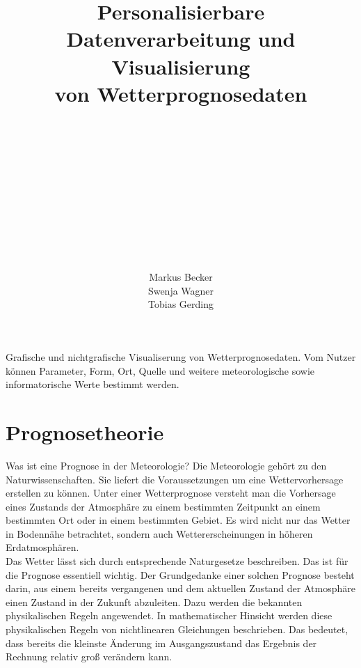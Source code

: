 \documentclass[a4paper,oneside,10pt,titlepage]{article}
\begin{document}
\linespread{.9}
\pagestyle{empty}
\title{Personalisierbare\\Datenverarbeitung und Visualisierung\\von Wetterprognosedaten}
\author{\\\\\\\\\\\\\\\\\\\\\\Markus Becker\\Swenja Wagner\\Tobias Gerding}

\maketitle
\pagestyle{empty}
\tableofcontents
\thispagestyle{empty}
\pagestyle{plain}
\newpage

Grafische und nichtgrafische Visualiserung von Wetterprognosedaten. Vom Nutzer können Parameter, Form, Ort, Quelle und weitere meteorologische sowie informatorische Werte bestimmt werden.
\section{Prognosetheorie}
Was ist eine Prognose in der Meteorologie?
Die Meteorologie gehört zu den Naturwissenschaften. Sie liefert die Voraussetzungen um eine Wettervorhersage erstellen zu können. Unter einer Wetterprognose versteht man die Vorhersage eines Zustands der Atmosphäre zu einem bestimmten Zeitpunkt an einem bestimmten Ort oder in einem bestimmten Gebiet. Es wird nicht nur das Wetter in Bodennähe betrachtet, sondern auch Wettererscheinungen in höheren Erdatmosphären.
\\
Das Wetter lässt sich durch entsprechende Naturgesetze beschreiben. Das ist für die Prognose essentiell wichtig. Der Grundgedanke einer solchen Prognose besteht darin, aus einem bereits vergangenen und dem aktuellen Zustand der Atmosphäre einen Zustand in der Zukunft abzuleiten. Dazu werden die bekannten physikalischen Regeln angewendet. In mathematischer Hinsicht werden diese physikalischen Regeln von nichtlinearen Gleichungen beschrieben. Das bedeutet, dass bereits die kleinste Änderung im Ausgangszustand das Ergebnis der Rechnung relativ groß verändern kann.%
\end{document}
